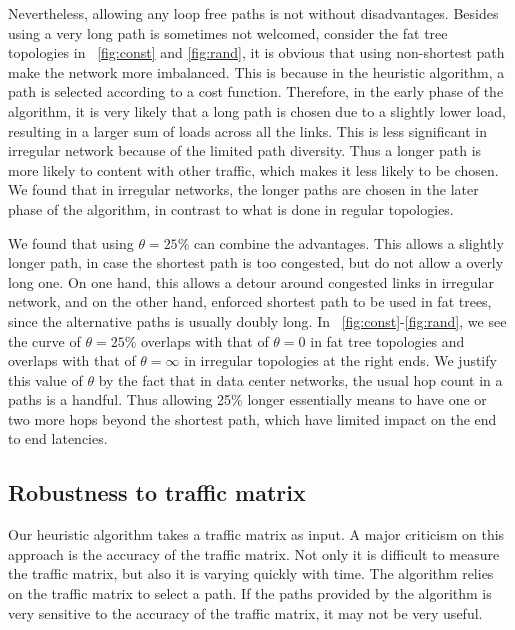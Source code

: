 \documentclass[conference]{IEEEtran}
\begin{document}
Nevertheless, allowing any loop free paths is not without disadvantages.
Besides using a very long path is sometimes not welcomed, consider the fat tree
topologies in \figurename~\ref{fig:const} and \ref{fig:rand}, it is obvious
that using non-shortest path make the network more imbalanced. This is because
in the heuristic algorithm, a path is selected according to a cost function.
Therefore, in the early phase of the algorithm, it is very likely that a long
path is chosen due to a slightly lower load, resulting in a larger sum of loads
across all the links. This is less significant in irregular network because of
the limited path diversity. Thus a longer path is more likely to content with
other traffic, which makes it less likely to be chosen. We found that in
irregular networks, the longer paths are chosen in the later phase of the
algorithm, in contrast to what is done in regular topologies.

We found that using $\theta=25\%$ can combine the advantages. This allows a
slightly longer path, in case the shortest path is too congested, but do not
allow a overly long one. On one hand, this allows a detour around congested
links in irregular network, and on the other hand, enforced shortest path to be
used in fat trees, since the alternative paths is usually doubly long. In
\figurename~\ref{fig:const}-\ref{fig:rand}, we see the curve of $\theta=25\%$
overlaps with that of $\theta=0$ in fat tree topologies and overlaps with that
of $\theta=\infty$ in irregular topologies at the right ends. We justify this
value of $\theta$ by the fact that in data center networks, the usual hop count
in a paths is a handful. Thus allowing 25\% longer essentially means to have
one or two more hops beyond the shortest path, which have limited impact on the
end to end latencies.

\subsection{Robustness to traffic matrix}\label{sub:varied}

Our heuristic algorithm takes a traffic matrix as input. A major criticism on
this approach is the accuracy of the traffic matrix. Not only it is difficult
to measure the traffic matrix, but also it is varying quickly with time. The
algorithm relies on the traffic matrix to select a path. If the paths provided
by the algorithm is very sensitive to the accuracy of the traffic matrix, it
may not be very useful.
\end{document}
